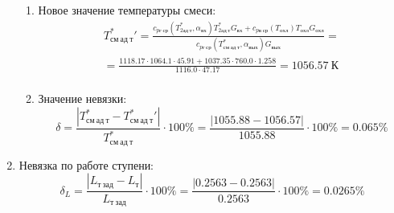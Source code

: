 \documentclass[a4paper,12pt]{article}
\begin{document}
\begin{enumerate}
\begin{enumerate}
            \item Новое значение температуры смеси:
            \begin{gather*}
                T_{см\ ад\ т}^*\prime = \frac{
                        c_{pг\ ср} (T_{2ад\ т}^*, \alpha_{вх}) T_{2ад\ т}^* G_{вх} + c_{pв\ ср} (T_{охл}) T_{охл} G_{охл}
                    }{
                        c_{pг\ ср} (T_{см\ ад\ т}^{*}, \alpha_{вых}) G_{вых}
                    } =\\
                = \frac{
                    1118.17
                    \cdot 1064.1 \cdot 45.91 +
                    1037.35
                    \cdot 760.0 \cdot 1.258
                }{
                    1116.0
                    \cdot  47.17
                } =
                1056.57\ К\\
            \end{gather*}

            \item Значение невязки:
            \[
                \delta = \frac{ \left| T_{см\ ад\ т}^{*} - T_{см\ ад\ т}^*\prime \right| }{T_{см\ ад\ т}^{*}} \cdot 100 \% =
                    \frac{
                        \left| 1055.88 - 1056.57 \right|
                    }{
                        1055.88
                    } \cdot 100 \% =
                0.065 \%
            \]
        \end{enumerate}

        

        \item Невязка по работе ступени:
        \[
            \delta_L = \frac{ \left| L_{т\ зад} - L_т \right| }{ L_{т\ зад} } \cdot 100 \% =
                \frac{
                    \left| 0.2563 - 0.2563 \right|
                }{
                    0.2563 } \cdot 100 \% =
            0.0265 \%
        \]

    \end{enumerate}
     
\end{document}
